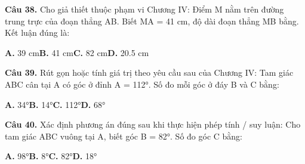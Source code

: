 \documentclass[11pt,a4paper]{article}
\begin{document}
\textbf{\color{primary} Câu 38.} Cho giả thiết thuộc phạm vi Chương IV: Điểm M nằm trên đường trung trực của đoạn thẳng AB. Biết MA = 41 cm, độ dài đoạn thẳng MB bằng. Kết luận đúng là:\par
\hspace*{1.5em}\textbf{A.} 39 cm\quad\quad \textbf{B.} 41 cm\quad\quad \textbf{C.} 82 cm\quad\quad \textbf{D.} 20.5 cm\par\vspace{2pt}
\textbf{\color{primary} Câu 39.} Rút gọn hoặc tính giá trị theo yêu cầu sau của Chương IV: Tam giác ABC cân tại A có góc ở đỉnh A = 112°. Số đo mỗi góc ở đáy B và C bằng:\par
\hspace*{1.5em}\textbf{A.} 34°\quad\quad \textbf{B.} 14°\quad\quad \textbf{C.} 112°\quad\quad \textbf{D.} 68°\par\vspace{2pt}
\textbf{\color{primary} Câu 40.} Xác định phương án đúng sau khi thực hiện phép tính / suy luận: Cho tam giác ABC vuông tại A, biết góc B = 82°. Số đo góc C bằng:\par
\hspace*{1.5em}\textbf{A.} 98°\quad\quad \textbf{B.} 8°\quad\quad \textbf{C.} 82°\quad\quad \textbf{D.} 18°\par\vspace{2pt}
\end{document}
